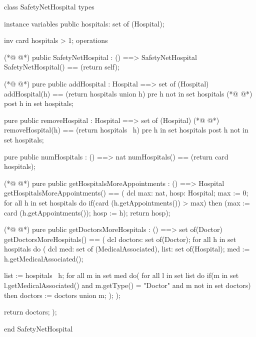 \begin{vdmpp}[breaklines=true]
class SafetyNetHospital
types

instance variables
 public hospitals: set of (Hospital);
 
 inv card hospitals > 1;
operations

(*@
\label{SafetyNetHospital:10}
@*)
 public SafetyNetHospital : () ==> SafetyNetHospital
  SafetyNetHospital() == (return self);
  
(*@
\label{addHospital:13}
@*)
 pure public addHospital : Hospital ==> set of (Hospital)
  addHospital(h) == (return hospitals union {h})
 pre h not in set hospitals
(*@
\label{removeHospital:16}
@*)
 post h in set hospitals;
 
 pure public removeHospital : Hospital ==> set of (Hospital)
(*@
\label{numHospitals:19}
@*)
  removeHospital(h) == (return hospitals \ {h})
 pre h in set hospitals
 post h not in set hospitals;
 
 pure public numHospitals : () ==> nat
  numHospitals() == (return card hospitals);
  
(*@
\label{getHospitalsMoreAppointments:26}
@*)
 pure public getHospitalsMoreAppointments : () ==> Hospital
  getHospitalsMoreAppointments() == (
                    dcl max: nat, hosp: Hospital;
                    max := 0;
                    for all h in set hospitals do
                     if(card (h.getAppointments()) > max)
                      then (max := card (h.getAppointments()); hosp := h);
                    return hosp);
 
(*@
\label{getDoctorsMoreHospitals:35}
@*)
 pure public getDoctorsMoreHospitals : () ==> set of(Doctor)
  getDoctorsMoreHospitals() == (
                  dcl doctors: set of(Doctor);
                  for all h in set hospitals do (
                   dcl med: set of (MedicalAssociated), list: set of(Hospital);
                   med := h.getMedicalAssociated();
                   
                   list := hospitals \ {h};
                   for all m in set med do(
                    for all l in set list do
                     if(m in set l.getMedicalAssociated() and m.getType() = "Doctor" and m not in set doctors)
                      then doctors := doctors union {m};
                   );
                  );
                  
                  return doctors;
                 );              
  
end SafetyNetHospital
\end{vdmpp}
